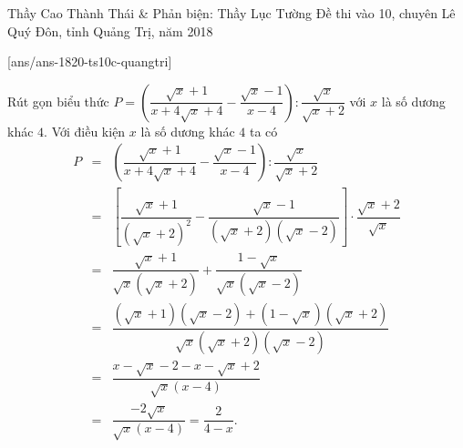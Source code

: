 
\begin{name}
{Thầy  Cao Thành Thái \& Phản biện: Thầy Lục Tường}
{Đề thi vào 10, chuyên Lê Quý Đôn, tỉnh Quảng Trị, năm 2018}
\end{name}
\setcounter{ex}{0}
[ans/ans-1820-ts10c-quangtri]

\begin{ex}%
 Rút gọn biểu thức $P=\left(\dfrac{\sqrt{x}+1}{x+4\sqrt{x}+4}-\dfrac{\sqrt{x}-1}{x-4}\right):\dfrac{\sqrt{x}}{\sqrt{x}+2}$ với $x$ là số dương khác $4$.
 \loigiai
  {
  Với điều kiện $x$ là số dương khác $4$ ta có
  \allowdisplaybreaks
  \begin{eqnarray*}
   P &=& \left(\dfrac{\sqrt{x}+1}{x+4\sqrt{x}+4}-\dfrac{\sqrt{x}-1}{x-4}\right):\dfrac{\sqrt{x}}{\sqrt{x}+2}\\
     &=& \left[\dfrac{\sqrt{x}+1}{\left(\sqrt{x}+2\right)^2} - \dfrac{\sqrt{x}-1}{\left(\sqrt{x}+2\right)\left(\sqrt{x}-2\right)} \right] \cdot \dfrac{\sqrt{x}+2}{\sqrt{x}}\\
     &=& \dfrac{\sqrt{x}+1}{\sqrt{x}\left(\sqrt{x}+2\right)} + \dfrac{1-\sqrt{x}}{\sqrt{x}\left(\sqrt{x}-2\right)}\\
     &=& \dfrac{\left(\sqrt{x}+1\right)\left(\sqrt{x}-2\right) + \left(1-\sqrt{x}\right)\left(\sqrt{x}+2\right)}{\sqrt{x}\left(\sqrt{x}+2\right)\left(\sqrt{x}-2\right)}\\
     &=& \dfrac{x-\sqrt{x}-2 - x-\sqrt{x}+2}{\sqrt{x}(x-4)}\\
     &=& \dfrac{-2\sqrt{x}}{\sqrt{x}(x-4)} = \dfrac{2}{4-x}.
  \end{eqnarray*}
  }
\end{ex}

